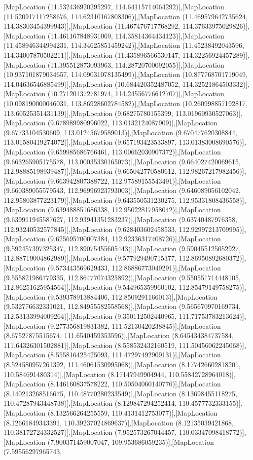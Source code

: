 [MapLocation (11.532436920295297, 114.64115714064292)],[MapLocation (11.520917117258676, 114.62310167808306)],[MapLocation (11.469579642735624, 114.38303454399943)],[MapLocation (11.467476717768292, 114.37633975029826)],[MapLocation (11.461167848931069, 114.35814364434123)],[MapLocation (11.458946344994231, 114.34625851459242)],[MapLocation (11.45238492043596, 114.34007870502211)],[MapLocation (11.435896566530147, 114.32256924457289)],[MapLocation (11.395512873093963, 114.28720700092055)],[MapLocation (10.937101879034657, 114.09031078135499)],[MapLocation (10.877768701719049, 114.04636546885499)],[MapLocation (10.684420352487052, 114.32521864503332)],[MapLocation (10.271201372781974, 114.24556776612707)],[MapLocation (10.098190000046031, 113.86928602784582)],[MapLocation (10.260998857192817, 113.60525351431139)],[MapLocation (9.68275780155399, 113.01960930527063)],[MapLocation (9.678989980996022, 113.0132124087909)],[MapLocation (9.67733104530609, 113.01245679589013)],[MapLocation (9.670477620308844, 113.01580419274072)],[MapLocation (9.657193423533897, 113.01383008690576)],[MapLocation (9.659985686766461, 113.00662030907372)],[MapLocation (9.663265905175578, 113.00035330165073)],[MapLocation (9.664027420069615, 112.98885198939487)],[MapLocation (9.665042770580612, 112.98267217982456)],[MapLocation (9.663942807388722, 112.97589155543491)],[MapLocation (9.660389055579543, 112.96996923793003)],[MapLocation (9.646089056102042, 112.95803877223179)],[MapLocation (9.643550531230275, 112.95331808436558)],[MapLocation (9.639488851686338, 112.95022817958042)],[MapLocation (9.639911945587627, 112.93941351283237)],[MapLocation (9.63740487976358, 112.93240532577845)],[MapLocation (9.628403602458533, 112.92997213709995)],[MapLocation (9.625695700007384, 112.92336317408726)],[MapLocation (9.592457397325347, 112.89075455605443)],[MapLocation (9.590455125052927, 112.88719004862989)],[MapLocation (9.577929490715377, 112.86950892680372)],[MapLocation (9.573443569629433, 112.86886773049291)],[MapLocation (9.555821986779335, 112.86477074325892)],[MapLocation (9.550551714448105, 112.86251625954564)],[MapLocation (9.544965359960102, 112.85479149758275)],[MapLocation (9.539378913884406, 112.8509291166013)],[MapLocation (9.532776632331021, 112.84955582558568)],[MapLocation (9.565670970169734, 112.53133994009264)],[MapLocation (9.350112502440965, 111.71753783213624)],[MapLocation (9.277356819831382, 111.52130420238845)],[MapLocation (8.67527875515674, 111.6540459353596)],[MapLocation (8.645434384737584, 111.64326301502881)],[MapLocation (8.558532432160519, 111.50456062245068)],[MapLocation (8.555816425425093, 111.47297492909131)],[MapLocation (8.524580957261392, 111.46061530995068)],[MapLocation (8.177426602818201, 110.584691480314)],[MapLocation (8.17147949904944, 110.55842728964018)],[MapLocation (8.146160837578222, 110.50504060140776)],[MapLocation (8.140213268516675, 110.48770280233549)],[MapLocation (8.13698455118275, 110.47287943448738)],[MapLocation (8.129847294252414, 110.4577732333155)],[MapLocation (8.132566264255559, 110.4131412753077)],[MapLocation (8.12661849343391, 110.39237024869637)],[MapLocation (8.12135039421868, 110.38172724332527)],[MapLocation (7.952573267044457, 110.03347098418772)],[MapLocation (7.900371459007047, 109.953686059235)],[MapLocation (7.59556297965743, 